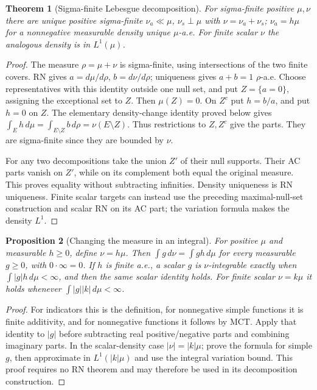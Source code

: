 \documentclass[11pt,oneside,openany]{book}
\newtheorem{theorem}{Theorem}[chapter]
\newtheorem{proposition}[theorem]{Proposition}
\theoremstyle{definition}
\theoremstyle{remark}
\newcommand{\family}[1]{}
\begin{document}
\begin{theorem}[Sigma-finite Lebesgue decomposition]\family{D11.15.lebesgue_decomposition_sigmafinite}\label{d11:15:lebesgue-decomposition-sigmafinite}
For sigma-finite positive $\mu,\nu$ there are unique positive sigma-finite
$\nu_a\ll\mu$, $\nu_s\perp\mu$ with $\nu=\nu_a+\nu_s$;
$\nu_a=h\mu$ for a nonnegative measurable density unique $\mu$-a.e.
For finite scalar $\nu$ the analogous density is in $L^1(\mu)$.
\end{theorem}
\begin{proof}
The measure $\rho=\mu+\nu$ is sigma-finite, using intersections of the two
finite covers. RN gives $a=d\mu/d\rho$, $b=d\nu/d\rho$; uniqueness gives
$a+b=1$ $\rho$-a.e. Choose representatives with this identity outside one
null set, and put $Z=\{a=0\}$, assigning the exceptional set to $Z$.
Then $\mu(Z)=0$. On $Z^c$ put $h=b/a$, and put $h=0$ on $Z$.
The elementary density-change identity proved below gives
$\int_Eh\,d\mu=\int_{E\setminus Z}b\,d\rho=\nu(E\setminus Z)$.
Thus restrictions to $Z,Z^c$ give the parts. They are sigma-finite since
they are bounded by $\nu$.

For any two decompositions take the union $Z'$ of their null supports.
Their AC parts vanish on $Z'$, while on its complement both equal the
original measure. This proves equality without subtracting infinities.
Density uniqueness is RN uniqueness. Finite scalar targets can instead use
the preceding maximal-null-set construction and scalar RN on its AC part;
the variation formula makes the density $L^1$.
\end{proof}

\begin{proposition}[Changing the measure in an integral]\family{D11.15.density_change_integral}\label{d11:15:density-change-integral}
For positive $\mu$ and measurable $h\geq0$, define $\nu=h\mu$.
Then $\int g\,d\nu=\int gh\,d\mu$ for every measurable $g\geq0$,
with $0\cdot\infty=0$. If $h$ is finite a.e., a scalar $g$ is
$\nu$-integrable exactly when $\int|g|h\,d\mu<\infty$, and then the
same scalar identity holds. For finite scalar $\nu=k\mu$ it holds whenever
$\int|g||k|\,d\mu<\infty$.
\end{proposition}
\begin{proof}
For indicators this is the definition, for nonnegative simple functions it
is finite additivity, and for nonnegative functions it follows by MCT.
Apply that identity to $|g|$ before subtracting real positive/negative parts
and combining imaginary parts. In the scalar-density case
$|\nu|=|k|\mu$; prove the formula for simple $g$, then approximate in
$L^1(|k|\mu)$ and use the integral variation bound. This proof requires
no RN theorem and may therefore be used in its decomposition construction.
\end{proof}
\end{document}
